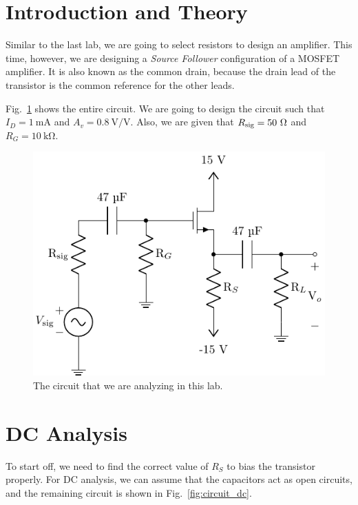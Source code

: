 \documentclass{../../ece-report}
\begin{document}
\maketitle

\section{Introduction and Theory}

Similar to the last lab, we are going to select resistors
to design an amplifier. This time, however, we are designing
a \emph{Source Follower} configuration of a MOSFET amplifier. 
It is also known as the common drain, because the drain 
lead of the transistor is the common reference for the other
leads.

Fig.~\ref{fig:circuit_full} shows the entire circuit.
We are going to design the circuit such that $I_D =
1~\si{\mA}$ and $A_v = 0.8~\si{\V/\V}$. Also, we are
given that $R_\textnormal{sig} = 50~\si{\ohm}$ and $R_G = 10~\si{\kohm}$.



\begin{figure}[h!]
  \centering
    \includegraphics{../circuits/circuit_full.pdf}
  \caption{The circuit that we are analyzing in this lab.}\label{fig:circuit_full}
\end{figure}

\section{DC Analysis}

To start off, we need to find the correct value of $R_S$
to bias the transistor properly. For DC analysis, we
can assume that the capacitors act as open circuits,
and the remaining circuit is shown in Fig.~\ref{fig:circuit_dc}.
\end{document}
